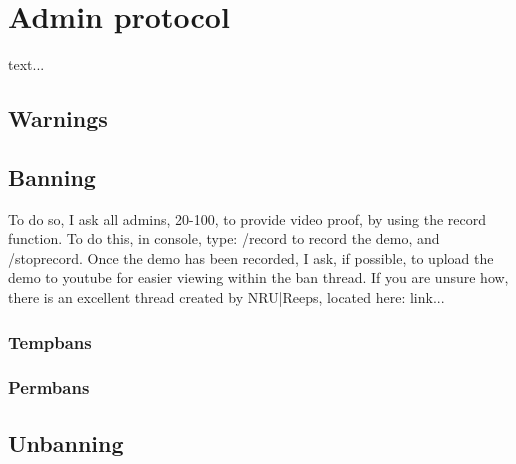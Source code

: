 \chapter{Admin protocol}
text...

\section{Warnings}
\label{protocol:warnings}

\section{Banning}
\label{protocol:banning}
To do so, I ask all admins, 20-100, to provide video proof, by using the record function. To do this, in console, type: /record to record the demo, and /stoprecord. Once the demo has been recorded, I ask, if possible, to upload the demo to youtube for easier viewing within the ban thread. If you are unsure how, there is an excellent thread created by NRU|Reeps, located here: link...
\subsection{Tempbans}

\subsection{Permbans}

\section{Unbanning}